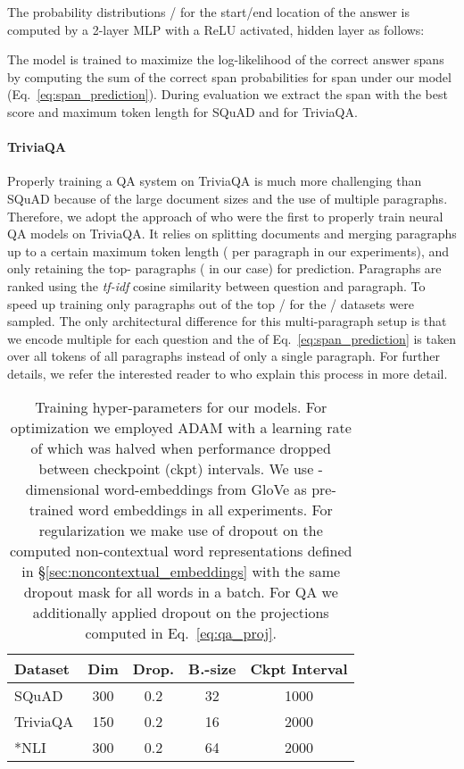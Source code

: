 \documentclass[11pt,a4paper]{article}
\begin{document}
The probability distributions / for the start/end location of the answer is computed by a 2-layer MLP with a ReLU activated, hidden layer  as follows:



The model is trained to maximize the log-likelihood of the correct answer spans by computing the sum of the correct span probabilities   for span  under our model (Eq.~\ref{eq:span_prediction}). During evaluation we extract the span  with the best score and maximum token length  for SQuAD and  for TriviaQA.

\paragraph{TriviaQA} Properly training a QA system on TriviaQA is much more challenging than SQuAD because of the large document sizes and the use of multiple paragraphs. Therefore, we adopt the approach of  who were the first to properly train neural QA models on TriviaQA. It relies on splitting documents and merging paragraphs up to a certain maximum token length ( per paragraph in our experiments), and only retaining the top- paragraphs ( in our case) for prediction. Paragraphs are ranked using the \textit{tf-idf} cosine similarity between question and paragraph. To speed up training only  paragraphs out of the top / for the / datasets were sampled. The only architectural difference for this multi-paragraph setup is that we encode multiple  for each question  and the  of Eq.~\ref{eq:span_prediction} is taken over all tokens of all paragraphs instead of only a single paragraph. For further details, we refer the interested reader to  who explain this process in more detail.

\begin{table}[t]
    \small
    \begin{tabular}{l c c c c}
        \toprule
        \textbf{Dataset} & \textbf{Dim}  & \textbf{Drop.} & \textbf{B.-size} & \textbf{Ckpt Interval} \\ \midrule
        SQuAD & 300 & 0.2 & 32 & 1000 \\
        TriviaQA & 150 & 0.2 & 16 & 2000 \\
        *NLI & 300 & 0.2 & 64 & 2000 \\
        \bottomrule
    \end{tabular}
    \caption{Training hyper-parameters for our models. For optimization we employed ADAM with a learning rate of  which was halved when performance dropped between checkpoint (ckpt) intervals. We use -dimensional word-embeddings from GloVe \citep{Pennington2014} as pre-trained word embeddings in all experiments. For regularization we make use of dropout on the computed non-contextual word representations  defined in \S\ref{sec:noncontextual_embeddings} with the same dropout mask for all words in a batch. For QA we additionally applied dropout on the projections computed in Eq.~\ref{eq:qa_proj}.
}\label{tab:training_details}
\end{table}
\end{document}
